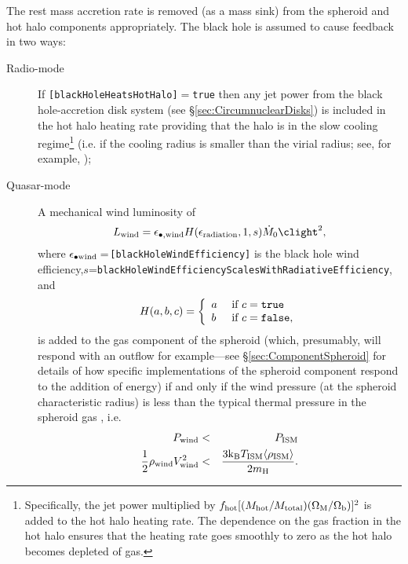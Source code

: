 The rest mass accretion rate is removed (as a mass sink) from the spheroid and hot halo components appropriately. The black hole is assumed to cause feedback in two ways:
\begin{description}
 \item [Radio-mode] If {\tt [blackHoleHeatsHotHalo]}$=${\tt true} then any jet power from the black hole-accretion disk system (see \S\ref{sec:CircumnuclearDisks}) is included in the hot halo heating rate providing that the halo is in the slow cooling regime\footnote{Specifically, the jet power multiplied by $f_{\rm hot} [(M_{\rm hot}/M_{\rm total}) (\Omega_{\rm M}/\Omega_{\rm b})]^2$ is added to the hot halo heating rate. The dependence on the gas fraction in the hot halo ensures that the heating rate goes smoothly to zero as the hot halo becomes depleted of gas.} (i.e. if the cooling radius is smaller than the virial radius; see, for example, \citealt{benson_cold_2010});
 \item [Quasar-mode] A mechanical wind luminosity of \citep{ostriker_momentum_2010}
\begin{equation}
 L_{\rm wind} = \epsilon_{\bullet, {\rm wind}} H(\epsilon_{\rm radiation},1,s) \dot{M}_0 \clight^2,
\end{equation}
where $\epsilon_{\bullet {\rm wind}}=${\tt [blackHoleWindEfficiency]} is the black hole wind efficiency,\newline $s$={\tt blackHoleWindEfficiencyScalesWithRadiativeEfficiency}, and
\begin{equation}
H(a,b,c) = \left\{\begin{array}{ll}a & \hbox{ if } c={\tt true} \\b & \hbox{ if } c={\tt false},\end{array}\right.
\end{equation}
is added to the gas \gls{component} of the spheroid (which, presumably, will respond with an outflow for example---see \S\ref{sec:ComponentSpheroid} for details of how specific implementations of the spheroid component respond to the addition of energy) if and only if the wind pressure (at the spheroid characteristic radius) is less than the typical thermal pressure in the spheroid gas \citep{ciotti_feedbackcentral_2009}, i.e.
\begin{eqnarray}
 P_{\rm wind} &<& P_{\rm ISM} \nonumber \\
 \frac{1}{2}\rho_{\rm wind} V_{\rm wind}^2 &<& {3 {\rm k_B} T_{\rm ISM} \langle \rho_{\rm ISM}\rangle \over 2 m_{\rm H}}.

\end{eqnarray}
\end{description}
